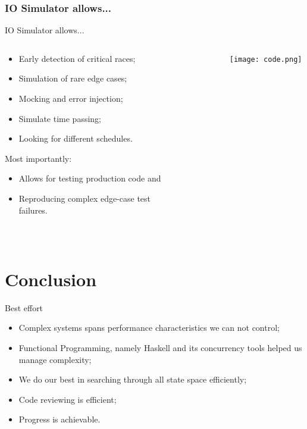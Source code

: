 \documentclass{beamer}
\begin{document}
\subsubsection*{IO Simulator allows...}
\begin{frame}{IO Simulator allows...}
  \begin{columns}
    \begin{column}{0.4\textwidth}
      \begin{itemize}
        \item Early detection of critical races;
        \item Simulation of rare \alert{edge cases};
        \item Mocking and \alert{error injection};
        \item Simulate time passing;
        \item Looking for \alert{different schedules}.
      \end{itemize}
      Most importantly:
      \begin{itemize}
        \item Allows for testing \alert{production code} and
        \item \alert{Reproducing} complex edge-case test failures.
      \end{itemize}
    
    \end{column}
    \begin{column}{0.6\textwidth}
      \texttt{[image: code.png]}
    \end{column}
  \end{columns}
\end{frame}

\section{Conclusion}

\begin{frame}{Best effort}
  \begin{itemize}
    \item Complex systems spans performance characteristics we can not control;
    \item Functional Programming, namely Haskell and its concurrency tools helped us manage complexity;
    \item We do our best in searching through all state space efficiently;
    \item Code reviewing is efficient;
    \item Progress is achievable.
  \end{itemize}
\end{frame}
\end{document}
